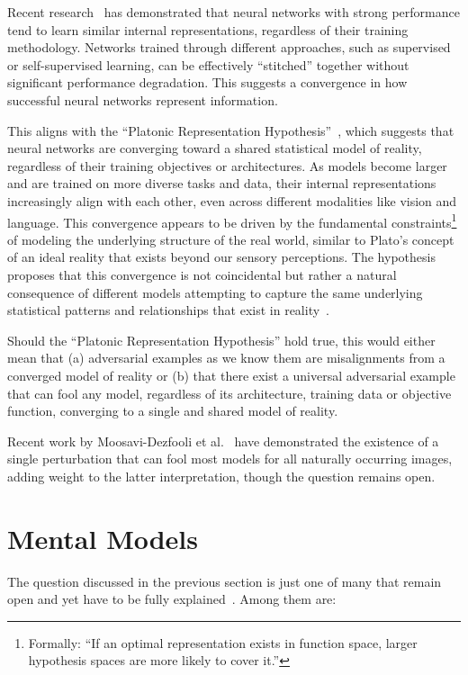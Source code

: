 \documentclass[a4paper, oneside]{discothesis}
\begin{document}
Recent research~\cite{bansal2021revisiting} has demonstrated that neural networks with strong performance tend to learn similar internal representations, regardless of their training methodology. Networks trained through different approaches, such as supervised or self-supervised learning, can be effectively ``stitched'' together without significant performance degradation. This suggests a convergence in how successful neural networks represent information.

This aligns with the ``Platonic Representation Hypothesis''~\cite{huh2024platonic}, which suggests that neural networks are converging toward a shared statistical model of reality, regardless of their training objectives or architectures. As models become larger and are trained on more diverse tasks and data, their internal representations increasingly align with each other, even across different modalities like vision and language. This convergence appears to be driven by the fundamental constraints\footnote{Formally: ``If an optimal representation exists in function space, larger hypothesis spaces are more likely to cover it.''} of modeling the underlying structure of the real world, similar to Plato's concept of an ideal reality that exists beyond our sensory perceptions. The hypothesis proposes that this convergence is not coincidental but rather a natural consequence of different models attempting to capture the same underlying statistical patterns and relationships that exist in reality~\cite{huh2024platonic}. 

Should the ``Platonic Representation Hypothesis'' hold true, this would either mean that (a) adversarial examples as we know them are misalignments from a converged model of reality or (b) that there exist a universal adversarial example that can fool any model, regardless of its architecture, training data or objective function, converging to a single and shared model of reality.

Recent work by Moosavi-Dezfooli et al.\ \cite{moosavi2017universal} have demonstrated the existence of a single perturbation that can fool most models for all naturally occurring images, adding weight to the latter interpretation, though the question remains open.

\section{Mental Models}

The question discussed in the previous section is just one of many that remain open and yet have to be fully explained~\cite{shamir2021dimpled}. Among them are:
\end{document}

